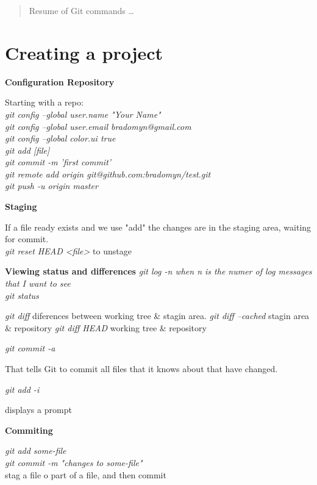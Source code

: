 \documentclass[12pt]{article}
\newcommand \tb[1]{\textbf{#1}}
\newcommand \ti[1]{\textit{#1}}
\begin{document}
\maketitle

\begin{abstract}
Resume of Git commands \ldots
\end{abstract}

\section*{Creating a project}

\tb{Configuration Repository}

Starting with a repo: \\
\ti{
 git config --global user.name "Your Name" \\
 git config --global user.email bradomyn@gmail.com \\
 git config --global color.ui true \\
 git add [file] \\
 git commit -m 'first commit' \\ 
 git remote add origin git@github.com:bradomyn/test.git \\
 git push -u origin master \\
}

\tb{Staging}

 If a file ready exists and we use "add" the changes are in the 
 staging area, waiting for commit. \\

 \ti{git reset HEAD <file>} to unstage

\tb{Viewing status and differences}
\noindent
\ti{ git log -n when n is the numer of log messages that I want to see \\
 git status \\
}

\ti{git diff} diferences between working tree \& stagin area.
\ti{git diff --cached} stagin area \& repository
\ti{git diff HEAD} working tree \& repository


\ti{git commit -a}

That tells Git to commit all files that it knows about that have 
changed.

\ti{git add -i}

displays a prompt

\tb{Commiting}

\noindent

\ti{ git add some-file \\
     git commit -m "changes to some-file" \\ }
stag a file o part of a file, and then commit
\end{document}
